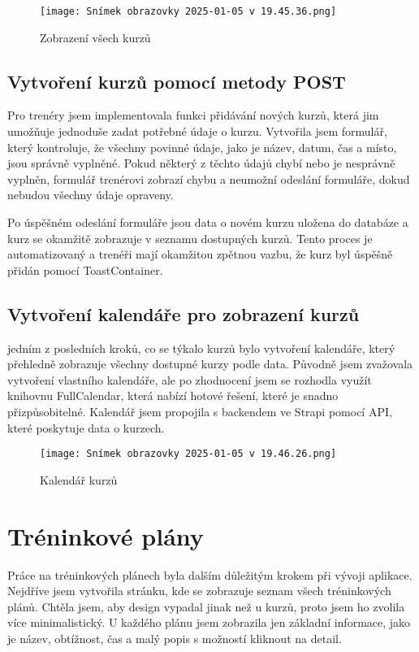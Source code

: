 \documentclass[12pt, a4paper,
twoside,        %
openany
]{report}
\begin{document}
\clearpage
\begin{figure}[h]
    \centering
    \texttt{[image: Snímek obrazovky 2025-01-05 v 19.45.36.png]}
    \caption{Zobrazení všech kurzů}
\end{figure}




\subsection{Vytvoření kurzů pomocí metody POST}
Pro trenéry jsem implementovala funkci přidávání nových kurzů, která jim umožňuje jednoduše zadat potřebné údaje o kurzu. Vytvořila jsem formulář, který kontroluje, že všechny povinné údaje, jako je název, datum, čas a místo, jsou správně vyplněné. Pokud některý z těchto údajů chybí nebo je nesprávně vyplněn, formulář trenérovi zobrazí chybu a neumožní odeslání formuláře, dokud nebudou všechny údaje opraveny.

Po úspěšném odeslání formuláře jsou data o novém kurzu uložena do databáze a kurz se okamžitě zobrazuje v seznamu dostupných kurzů. Tento proces je automatizovaný a trenéři mají okamžitou zpětnou vazbu, že kurz byl úspěšně přidán pomocí ToastContainer.

\subsection{Vytvoření kalendáře pro zobrazení kurzů}
jedním z posledních kroků, co se týkalo kurzů bylo vytvoření kalendáře, který přehledně zobrazuje všechny dostupné kurzy podle data. Původně jsem zvažovala vytvoření vlastního kalendáře, ale po zhodnocení jsem se rozhodla využít knihovnu FullCalendar, která nabízí hotové řešení, které je snadno přizpůsobitelné. Kalendář jsem propojila s backendem ve Strapi pomocí API, které poskytuje data o kurzech.

\begin{figure}[h]
    \centering
    \texttt{[image: Snímek obrazovky 2025-01-05 v 19.46.26.png]}
    \caption{Kalendář kurzů}
\end{figure}

\section{Tréninkové plány}
Práce na tréninkových plánech byla dalším důležitým krokem při vývoji aplikace. Nejdříve jsem vytvořila stránku, kde se zobrazuje seznam všech tréninkových plánů. Chtěla jsem, aby design vypadal jinak než u kurzů, proto jsem ho zvolila více minimalistický. U každého plánu jsem zobrazila jen základní informace, jako je název, obtížnost, čas a malý popis s možností kliknout na detail.
\end{document}
